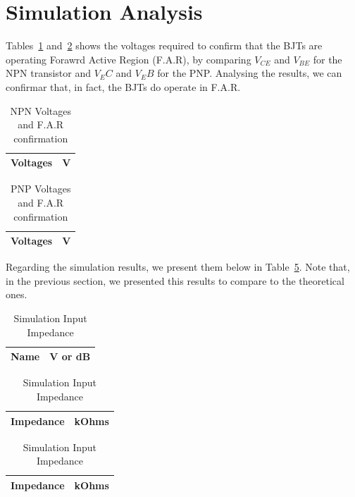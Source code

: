 \section{Simulation Analysis}
\label{sec:simulation}

	Tables~\ref{tab1:npn} and~\ref{tab1:pnp}  shows the voltages required to confirm that the BJTs are operating Forawrd Active Region (F.A.R), 
by comparing $V_{CE}$ and $V_{BE}$ for the NPN transistor and $V_EC$ and $V_EB$ for the PNP. Analysing the results, we can confirmar that, in fact,
the BJTs do operate in F.A.R.

\begin{table}[H]
  \centering
  \begin{tabular}{|l|r|}
    \hline    
    {\bf Voltages} & {\bf V} \\ \hline
    
  \end{tabular}
  \caption{NPN Voltages and F.A.R confirmation}
  \label{tab1:npn}
\end{table}

\begin{table}[H]
  \centering
  \begin{tabular}{|l|r|}
    \hline    
    {\bf Voltages} & {\bf V} \\ \hline
    
  \end{tabular}
  \caption{PNP Voltages and F.A.R confirmation}
  \label{tab1:pnp}
\end{table}


Regarding the simulation results, we present them below in Table~\ref{tab1:sim}.
Note that, in the previous section, we presented this results to compare to the theoretical
ones.

\begin{table}[H]
  \centering
  \begin{tabular}{|l|r|}
    \hline    
    {\bf Name} & {\bf V or dB} \\ \hline
    
  \end{tabular}
  \begin{tabular}{|l|c|}
    \hline
    {\bf Impedance} & {\bf kOhms} \\ \hline
    
  \end{tabular}
  \begin{tabular}{|l|c|}
    \hline
    {\bf Impedance} & {\bf kOhms} \\ \hline
    
  \end{tabular}
    \caption{Simulation Input Impedance}
    \label{tab1:sim}
\end{table}

